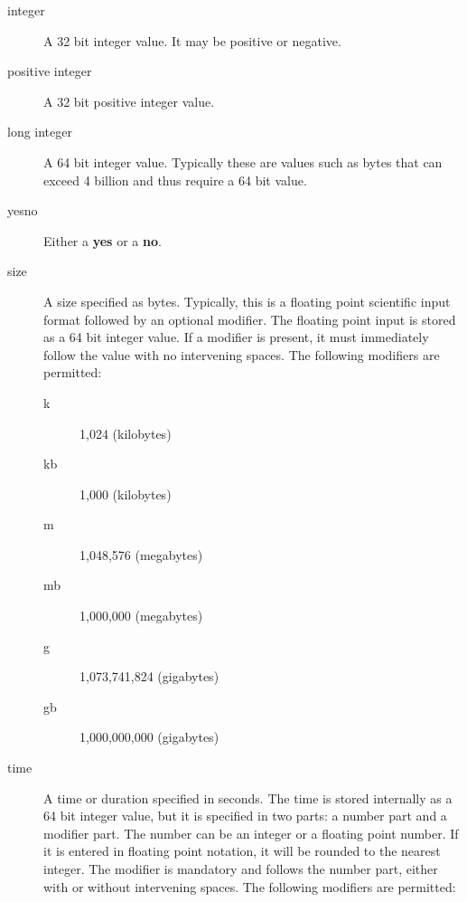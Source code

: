 \begin{description}
\item [integer]
   A 32 bit integer value. It may be positive or negative. 

\item [positive integer]
   A 32 bit positive integer value. 

\item [long integer]
   A 64 bit integer value. Typically these  are values such as bytes that can
exceed 4 billion and thus  require a 64 bit value. 

\item [yes\vb{}no]
   Either a {\bf yes} or a {\bf no}. 

\label{Size1}
\item [size]
A size specified as bytes. Typically, this is  a floating point scientific
input format followed by an optional modifier. The  floating point input is
stored as a 64 bit integer value.  If a modifier is present, it must
immediately follow the  value with no intervening spaces. The following
modifiers are permitted:  

\begin{description}
\item [k]
   1,024 (kilobytes)  

\item [kb]
   1,000 (kilobytes)  

\item [m]
   1,048,576 (megabytes)  

\item [mb]
   1,000,000 (megabytes)  

\item [g]
   1,073,741,824 (gigabytes) 

\item [gb]
   1,000,000,000 (gigabytes) 
\end{description}

\label{Time}
\item [time]
A time or duration specified in seconds.  The time is stored internally as
a 64 bit integer value, but it is specified in two parts: a number part and
a modifier part.  The number can be an integer or a floating point number.
If it is entered in floating point notation, it will be rounded to the
nearest integer.  The modifier is mandatory and follows the number part,
either with or without intervening spaces.  The following modifiers are
permitted:


\end{description}

